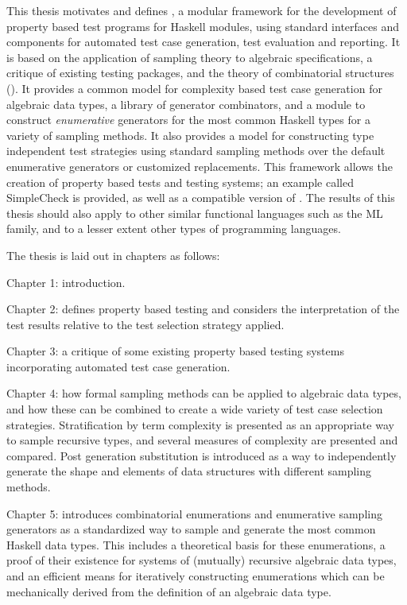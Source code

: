 This thesis motivates and defines \GC,
a modular framework for the development of property based test programs for Haskell modules,
using standard interfaces and components for automated test case generation,
test evaluation and reporting.
It is based on the application of sampling theory to algebraic specifications,
a critique of existing testing packages,
and the theory of combinatorial structures (\cite{FlajoletSedgewick2009}).
It provides a common model for complexity based test case generation for algebraic data types,
a library of generator combinators,
and a module to construct \emph{enumerative} generators
for the most common Haskell types 
for a variety of sampling methods.
It also provides a model for constructing type independent test strategies
using standard sampling methods
over the default enumerative generators or customized replacements.
This framework allows the creation of property based tests and testing systems;
an example called SimpleCheck is provided,
as well as a \GC compatible version of \QC.
The results of this thesis should also apply to 
other similar functional languages such as the ML family,
and to a lesser extent other types of programming languages.

The thesis is laid out in chapters as follows:

Chapter 1: introduction.

Chapter 2: defines property based testing and 
considers the interpretation of the test results
relative to the test selection strategy applied.

Chapter 3: a critique of some 
existing property based testing systems
incorporating automated test case generation.

Chapter 4: how formal sampling methods can be applied to algebraic data types,
and how these can be combined to create a wide variety of test case selection strategies.
Stratification by term complexity is presented as
an appropriate way to sample recursive types,
and several measures of complexity are presented and compared.
Post generation substitution is introduced as 
a way to independently generate the shape and elements of data structures
with different sampling methods.

Chapter 5: introduces combinatorial enumerations and
enumerative sampling generators as
a standardized way to sample and generate the most common Haskell data types.
This includes a theoretical basis for these enumerations,
a proof of their existence for systems of (mutually) recursive algebraic data types,
and an efficient means for iteratively constructing enumerations
which can be mechanically derived from the definition of an algebraic data type.

